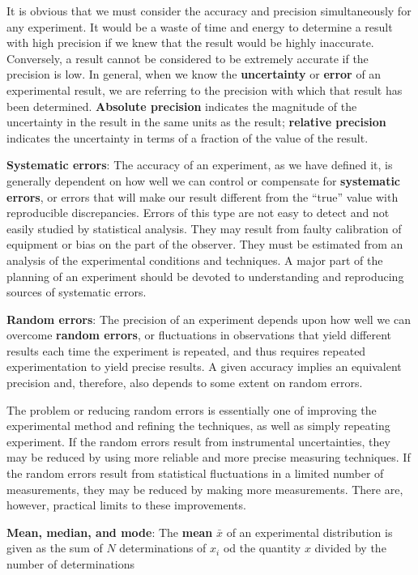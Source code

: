 \documentclass[a4paper,10pt]{article}
\begin{document}
{\noindent}It is obvious that we must consider the accuracy and precision simultaneously for any experiment. It would be a waste of time and energy to determine a result with high precision if we knew that the result would be highly inaccurate. Conversely, a result cannot be considered to be extremely accurate if the precision is low. In general, when we know the \textbf{uncertainty} or \textbf{error} of an experimental result, we are referring to the precision with which that result has been determined. \textbf{Absolute precision} indicates the magnitude of the uncertainty in the result in the same units as the result; \textbf{relative precision} indicates the uncertainty in terms of a fraction of the value of the result.

{\noindent}\textbf{Systematic errors}: The accuracy of an experiment, as we have defined it, is generally dependent on how well we can control or compensate for \textbf{systematic errors}, or errors that will make our result different from the ``true'' value with reproducible discrepancies. Errors of this type are not easy to detect and not easily studied by statistical analysis. They may result from faulty calibration of equipment or bias on the part of the observer. They must be estimated from an analysis of the experimental conditions and techniques. A major part of the planning of an experiment should be devoted to understanding and reproducing sources of systematic errors.

{\noindent}\textbf{Random errors}: The precision of an experiment depends upon how well we can overcome \textbf{random errors}, or fluctuations in observations that yield different results each time the experiment is repeated, and thus requires repeated experimentation to yield precise results. A given accuracy implies an equivalent precision and, therefore, also depends to some extent on random errors. 

{\noindent}The problem or reducing random errors is essentially one of improving the experimental method and refining the techniques, as well as simply repeating experiment. If the random errors result from instrumental uncertainties, they may be reduced by using more reliable and more precise measuring techniques. If the random errors result from statistical fluctuations in a limited number of measurements, they may be reduced by making more measurements. There are, however, practical limits to these improvements. 

{\noindent}\textbf{Mean, median, and mode}: The \textbf{mean} $\bar{x}$ of an experimental distribution is given as the sum of $N$ determinations of $x_i$ od the quantity $x$ divided by the number of determinations
\end{document}
